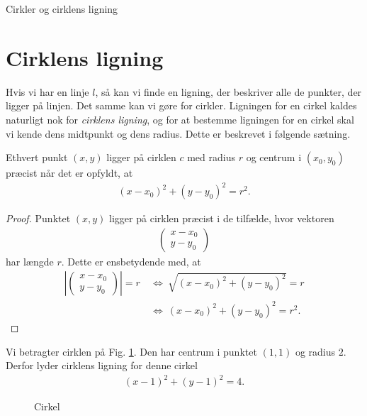 
\begin{center}
\Huge
Cirkler og cirklens ligning
\end{center}
\section*{Cirklens ligning}

Hvis vi har en linje $l$, så kan vi finde en ligning, der beskriver alle de punkter, der ligger på linjen. Det samme kan vi gøre for cirkler. Ligningen for en cirkel kaldes naturligt nok for \textit{cirklens ligning}, og for at bestemme ligningen for en cirkel skal vi kende dens midtpunkt og dens radius. Dette er beskrevet i følgende sætning.
\begin{setn}
Ethvert punkt $(x,y)$ ligger på cirklen $c$ med radius $r$ og centrum i $(x_0,y_0)$ præcist når det er opfyldt, at 
\begin{align*}
(x-x_0)^2+(y-y_0)^2 = r^2.
\end{align*}
\end{setn}
\begin{proof}
Punktet $(x,y)$ ligger på cirklen præcist i de tilfælde, hvor vektoren 
\begin{align*}
\begin{pmatrix}
x-x_0 \\ y-y_0
\end{pmatrix}
\end{align*}
har længde $r$. Dette er ensbetydende med, at 
\begin{align*}
\left|\begin{pmatrix}
x-x_0 \\ y-y_0
\end{pmatrix}\right| = r \ &\Leftrightarrow \ \sqrt{(x-x_0)^2+(y-y_0)^2} = r \\
&\Leftrightarrow \ (x-x_0)^2+(y-y_0)^2 = r^2.
\end{align*}
\end{proof}

\begin{exa}
Vi betragter cirklen på Fig. \ref{fig:cirkel}. Den har centrum i punktet $(1,1)$ og radius $2$. Derfor lyder cirklens ligning for denne cirkel
\begin{align*}
(x-1)^2 + (y-1)^2 = 4.
\end{align*}
\begin{figure}[H]
\centering
{}
\caption{Cirkel}
\label{fig:cirkel}
\end{figure}
\end{exa}

